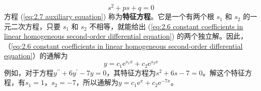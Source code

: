 	\begin{equation}
		\boxed{
			s^2+ps+q=0
		}
		\label{eq:2.7 auxiliary equation}
	\end{equation}
	方程 (\ref{eq:2.7 auxiliary equation}) 称为\textbf{特征方程}。它是一个有两个根 $s_1$ 和 $s_2$ 的一元二次方程，只要 $s_1$ 和 $s_2$ 不相等，就能给出 (\ref{eq:2.6 constant coefficients in linear homogeneous second-order differential equation}) 的两个独立解。因此，（\ref{eq:2.6 constant coefficients in linear homogeneous second-order differential equation}）的通解为
	\begin{equation}
		\boxed{
			y = c_1\mathrm{e}^{s_1x}+c_2\mathrm{e}^{s_2x}
		}
		\label{eq:2.8 general solution for 2.6}
	\end{equation}
	例如，对于方程$y^{\prime\prime}+6y^{\prime}-7y=0$，其特征方程为$s^2+6s-7=0$。解这个特征方程，有$s_1=1$，$s_2=-7$，所以通解为$y = c_1\mathrm{e}^{x}+c_2\mathrm{e}^{-7x}$。

